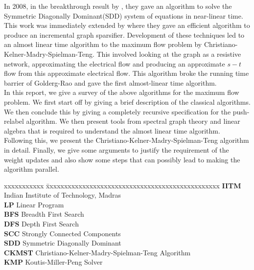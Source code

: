 \documentclass[BTech]{iitmdiss}
\begin{document}
In 2008, in the breakthrough result by \cite{DBLP:journals/corr/abs-0808-4134}, they gave an algorithm to solve the Symmetric Diagonally Dominant(SDD) system of equations in 
near-linear time. This work was immediately extended by \cite{DBLP:journals/corr/abs-1003-2958} where they gave an efficient algorithm to produce an incremental graph sparsifier.
Development of these techniques led to an almost linear time algorithm to the maximum flow problem by Christiano-Kelner-Madry-Spielman-Teng.
This involved looking at the graph as a resistive network, approximating the electrical flow and producing an approximate $s-t$ flow from this approximate
electrical flow. This algorithm broke the running time barrier of Golderg-Rao and gave the first almost-linear time algorithm. \\

In this report, we give a survey of the above algorithms for the maximum flow problem. We first start off by giving a brief description of the 
classical algorithms. We then conclude this by giving a completely recursive specification for the push-relabel algorithm.
We then present tools from spectral graph theory and linear algebra that is required to understand the almost linear 
time algorithm. Following this, we present the Christiano-Kelner-Madry-Spielman-Teng algorithm in detail. Finally, we give some arguments to justify the requirement of the weight updates and also show some steps that can possibly
lead to making the algorithm parallel.\\

\pagebreak



\begin{singlespace}
\tableofcontents
\thispagestyle{empty}

\end{singlespace}


\abbreviations
 
\noindent 
\begin{tabbing}
 xxxxxxxxxxx \= xxxxxxxxxxxxxxxxxxxxxxxxxxxxxxxxxxxxxxxxxxxxxxxx \kill
\textbf{IITM}   \> Indian Institute of Technology, Madras \\
 \textbf{LP}  \> Linear Program \\
\textbf{BFS} \> Breadth First Search \\
\textbf{DFS} \> Depth First Search \\
 \textbf{SCC} \> Strongly Connected Components \\
\textbf{SDD} \> Symmetric Diagonally Dominant \\
\textbf{CKMST} \> Christiano-Kelner-Madry-Spielman-Teng Algorithm \\
 \textbf{KMP} \> Koutis-Miller-Peng Solver \\
\end{tabbing}
\end{document}
